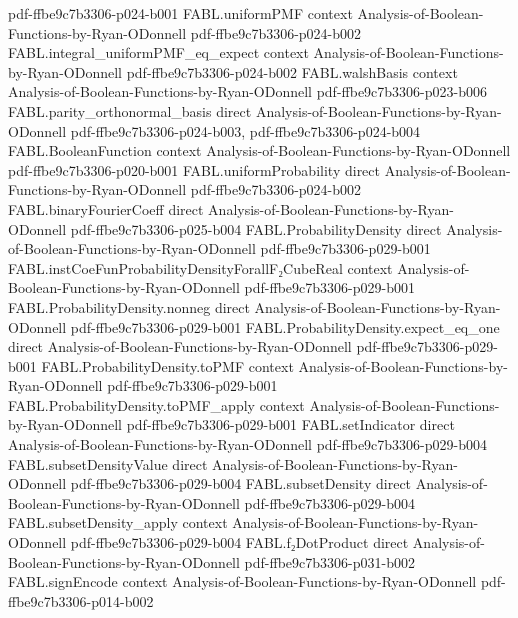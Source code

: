 \begin{theorem}
  {pdf-ffbe9c7b3306-p024-b001}
\proofstep
  {FABL.uniformPMF}
  {context}
  {Analysis-of-Boolean-Functions-by-Ryan-ODonnell}
  {pdf-ffbe9c7b3306-p024-b002}
\proofstep
  {FABL.integral_uniformPMF_eq_expect}
  {context}
  {Analysis-of-Boolean-Functions-by-Ryan-ODonnell}
  {pdf-ffbe9c7b3306-p024-b002}
\proofstep
  {FABL.walshBasis}
  {context}
  {Analysis-of-Boolean-Functions-by-Ryan-ODonnell}
  {pdf-ffbe9c7b3306-p023-b006}
\proofstep
  {FABL.parity_orthonormal_basis}
  {direct}
  {Analysis-of-Boolean-Functions-by-Ryan-ODonnell}
  {pdf-ffbe9c7b3306-p024-b003,
    pdf-ffbe9c7b3306-p024-b004}
\proofstep
  {FABL.BooleanFunction}
  {context}
  {Analysis-of-Boolean-Functions-by-Ryan-ODonnell}
  {pdf-ffbe9c7b3306-p020-b001}
\proofstep
  {FABL.uniformProbability}
  {direct}
  {Analysis-of-Boolean-Functions-by-Ryan-ODonnell}
  {pdf-ffbe9c7b3306-p024-b002}
\proofstep
  {FABL.binaryFourierCoeff}
  {direct}
  {Analysis-of-Boolean-Functions-by-Ryan-ODonnell}
  {pdf-ffbe9c7b3306-p025-b004}
\proofstep
  {FABL.ProbabilityDensity}
  {direct}
  {Analysis-of-Boolean-Functions-by-Ryan-ODonnell}
  {pdf-ffbe9c7b3306-p029-b001}
\proofstep
  {FABL.instCoeFunProbabilityDensityForallF₂CubeReal}
  {context}
  {Analysis-of-Boolean-Functions-by-Ryan-ODonnell}
  {pdf-ffbe9c7b3306-p029-b001}
\proofstep
  {FABL.ProbabilityDensity.nonneg}
  {direct}
  {Analysis-of-Boolean-Functions-by-Ryan-ODonnell}
  {pdf-ffbe9c7b3306-p029-b001}
\proofstep
  {FABL.ProbabilityDensity.expect_eq_one}
  {direct}
  {Analysis-of-Boolean-Functions-by-Ryan-ODonnell}
  {pdf-ffbe9c7b3306-p029-b001}
\proofstep
  {FABL.ProbabilityDensity.toPMF}
  {context}
  {Analysis-of-Boolean-Functions-by-Ryan-ODonnell}
  {pdf-ffbe9c7b3306-p029-b001}
\proofstep
  {FABL.ProbabilityDensity.toPMF_apply}
  {context}
  {Analysis-of-Boolean-Functions-by-Ryan-ODonnell}
  {pdf-ffbe9c7b3306-p029-b001}
\proofstep
  {FABL.setIndicator}
  {direct}
  {Analysis-of-Boolean-Functions-by-Ryan-ODonnell}
  {pdf-ffbe9c7b3306-p029-b004}
\proofstep
  {FABL.subsetDensityValue}
  {direct}
  {Analysis-of-Boolean-Functions-by-Ryan-ODonnell}
  {pdf-ffbe9c7b3306-p029-b004}
\proofstep
  {FABL.subsetDensity}
  {direct}
  {Analysis-of-Boolean-Functions-by-Ryan-ODonnell}
  {pdf-ffbe9c7b3306-p029-b004}
\proofstep
  {FABL.subsetDensity_apply}
  {context}
  {Analysis-of-Boolean-Functions-by-Ryan-ODonnell}
  {pdf-ffbe9c7b3306-p029-b004}
\proofstep
  {FABL.f₂DotProduct}
  {direct}
  {Analysis-of-Boolean-Functions-by-Ryan-ODonnell}
  {pdf-ffbe9c7b3306-p031-b002}
\proofstep
  {FABL.signEncode}
  {context}
  {Analysis-of-Boolean-Functions-by-Ryan-ODonnell}
  {pdf-ffbe9c7b3306-p014-b002}

\end{theorem}
